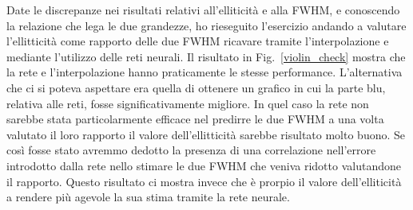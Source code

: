 \documentclass[12pt,a4paper,final]{book}
\begin{document}

Date le discrepanze nei risultati relativi all'elliticità e alla FWHM, e conoscendo la relazione che lega le due grandezze, ho rieseguito l'esercizio andando a valutare l'ellitticità come rapporto delle due FWHM ricavare tramite l'interpolazione e mediante l'utilizzo delle reti neurali. Il risultato in Fig.~\ref{violin_check} mostra che la rete e l'interpolazione hanno praticamente le stesse performance.
L'alternativa che ci si poteva aspettare era quella di ottenere un grafico in cui la parte blu, relativa alle reti, fosse significativamente migliore. In quel caso la rete non sarebbe stata particolarmente efficace nel predirre le due FWHM a una volta valutato il loro rapporto il valore dell'ellitticità sarebbe risultato molto buono. Se così fosse stato avremmo dedotto la presenza di una correlazione nell'errore introdotto dalla rete nello stimare le due FWHM che veniva ridotto valutandone il rapporto.
Questo risultato ci mostra invece che è prorpio il valore dell'elliticità a rendere più agevole la sua stima tramite la rete neurale.
\end{document}
